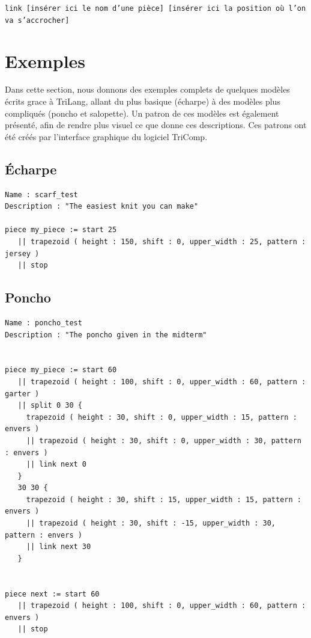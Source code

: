 \documentclass[a4paper,10pt]{article}
\begin{document}
\noindent \texttt{link [insérer ici le nom d'une pièce] [insérer ici la position où l'on va s'accrocher]}


  

\appendix

\section{Exemples}

Dans cette section, nous donnons des exemples complets de quelques modèles écrits grace à TriLang, allant du plus basique (écharpe) à des modèles plus compliqués (poncho et salopette). Un patron de ces modèles est également présenté, afin de rendre plus visuel ce que donne ces descriptions. Ces patrons ont été créés par l'interface graphique du logiciel TriComp.

\subsection{Écharpe}



\begin{lstlisting}
Name : scarf_test
Description : "The easiest knit you can make"

piece my_piece := start 25
   || trapezoid ( height : 150, shift : 0, upper_width : 25, pattern : jersey )
   || stop
\end{lstlisting}


\subsection{Poncho}

\begin{lstlisting}
Name : poncho_test
Description : "The poncho given in the midterm"


piece my_piece := start 60
   || trapezoid ( height : 100, shift : 0, upper_width : 60, pattern : garter )
   || split 0 30 { 
     trapezoid ( height : 30, shift : 0, upper_width : 15, pattern : envers )
     || trapezoid ( height : 30, shift : 0, upper_width : 30, pattern : envers )
     || link next 0
   }
   30 30 { 
     trapezoid ( height : 30, shift : 15, upper_width : 15, pattern : envers )
     || trapezoid ( height : 30, shift : -15, upper_width : 30, pattern : envers )
     || link next 30
   }


piece next := start 60
   || trapezoid ( height : 100, shift : 0, upper_width : 60, pattern : envers )
   || stop
\end{lstlisting}
\end{document}
